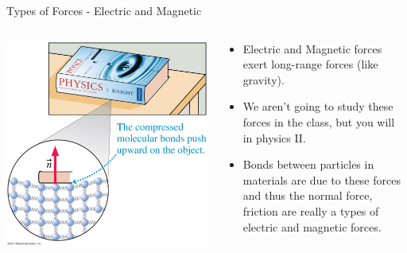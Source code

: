 \documentclass{beamer}
\begin{document}
\begin{frame}{Types of Forces - Electric and Magnetic}
\begin{columns}
\begin{column}{0.4\textwidth}
\begin{center}
   \includegraphics[width=\textwidth]{../figures/05_06_Figure.jpg}
\end{center}
\end{column}
\begin{column}{0.6\textwidth}
\begin{itemize}
   \item Electric and Magnetic forces exert long-range forces (like gravity).
   \item We aren't going to study these forces in the class, but you will in physics II.
   \item Bonds between particles in materials are due to these forces and thus the normal force, friction are really a types of electric and magnetic forces.
\end{itemize}
\end{column}
\end{columns}
\end{frame}
\end{document}
